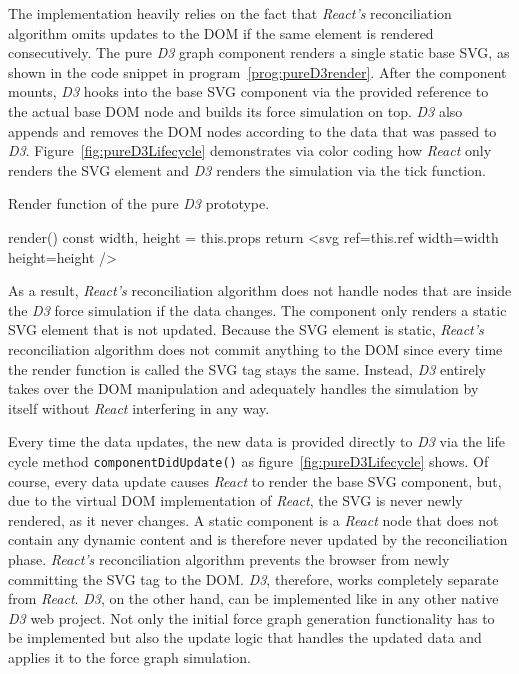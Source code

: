 The implementation heavily relies on the fact that \emph{React's} reconciliation algorithm omits updates to the DOM if the same element is rendered consecutively. The pure \emph{D3} graph component renders a single static base SVG, as shown in the code snippet in program~\ref{prog:pureD3render}. After the component mounts, \emph{D3} hooks into the base SVG component via the provided reference to the actual base DOM node and builds its force simulation on top. \emph{D3} also appends and removes the DOM nodes according to the data that was passed to \emph{D3}. Figure~\ref{fig:pureD3Lifecycle} demonstrates via color coding how \emph{React} only renders the SVG element and \emph{D3} renders the simulation via the tick function.

\begin{program}
\caption{Render function of the pure \emph{D3} prototype.}
\label{prog:pureD3render}
\begin{JsCode}
render() {
  const { width, height } = this.props
  return <svg ref={this.ref} width={width} height={height} />
}
\end{JsCode}
\end{program}

As a result, \emph{React's} reconciliation algorithm does not handle nodes that are inside the \emph{D3} force simulation if the data changes. The component only renders a static SVG element that is not updated. Because the SVG element is static, \emph{React's} reconciliation algorithm does not commit anything to the DOM since every time the render function is called the SVG tag stays the same. Instead, \emph{D3} entirely takes over the DOM manipulation and adequately handles the simulation by itself without \emph{React} interfering in any way.

Every time the data updates, the new data is provided directly to \emph{D3} via the life cycle method \texttt{componentDidUpdate()} as figure~\ref{fig:pureD3Lifecycle} shows. Of course, every data update causes \emph{React} to render the base SVG component, but, due to the virtual DOM implementation of \emph{React}, the SVG is never newly rendered, as it never changes. A static component is a \emph{React} node that does not contain any dynamic content and is therefore never updated by the reconciliation phase. \emph{React's} reconciliation algorithm prevents the browser from newly committing the SVG tag to the DOM. \emph{D3}, therefore, works completely separate from \emph{React}. \emph{D3}, on the other hand, can be implemented like in any other native \emph{D3} web project. Not only the initial force graph generation functionality has to be implemented but also the update logic that handles the updated data and applies it to the force graph simulation.

